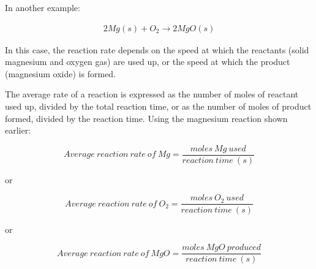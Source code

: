 In another example:

\begin{eqnarray*}
2Mg(s) + O_{2} \rightarrow 2Mg O(s)
\end{eqnarray*}

In this case, the reaction rate depends on the speed at which the reactants (solid
magnesium and oxygen gas) are used up, or the speed at which the product (magnesium oxide) is formed.


The average rate of a reaction is expressed as the number of
moles of reactant used up, divided by the total reaction time, or as the number of moles of product formed, divided by the reaction time. Using the magnesium reaction shown earlier:

\begin{equation*}
Average \ reaction \ rate \ of \ Mg = \frac{moles \ Mg \ used}{reaction \ time \ (s)}
\end{equation*}

\begin{center}
or
\end{center}

\begin{equation*}
Average \ reaction \ rate \ of \ O_{2} = \frac{moles \ O_{2} \ used}{reaction \ time \ (s)}
\end{equation*}

\begin{center}
or
\end{center}

\begin{equation*}
Average \ reaction \ rate \ of \ MgO = \frac{moles \ MgO \ produced}{reaction \ time \ (s)}
\end{equation*}

